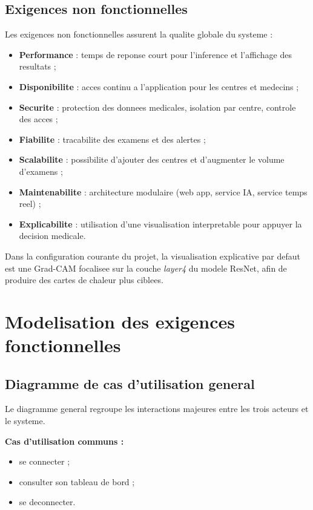 \subsection{Exigences non fonctionnelles}
Les exigences non fonctionnelles assurent la qualite globale du systeme :
\begin{itemize}
    \item \textbf{Performance} : temps de reponse court pour l'inference et l'affichage des resultats ;
    \item \textbf{Disponibilite} : acces continu a l'application pour les centres et medecins ;
    \item \textbf{Securite} : protection des donnees medicales, isolation par centre, controle des acces ;
    \item \textbf{Fiabilite} : tracabilite des examens et des alertes ;
    \item \textbf{Scalabilite} : possibilite d'ajouter des centres et d'augmenter le volume d'examens ;
    \item \textbf{Maintenabilite} : architecture modulaire (web app, service IA, service temps reel) ;
    \item \textbf{Explicabilite} : utilisation d'une visualisation interpretable pour appuyer la decision medicale.
\end{itemize}

Dans la configuration courante du projet, la visualisation explicative par defaut est une Grad-CAM
focalisee sur la couche \textit{layer4} du modele ResNet, afin de produire des cartes de chaleur plus ciblees.

\section{Modelisation des exigences fonctionnelles}

\subsection{Diagramme de cas d'utilisation general}
Le diagramme general regroupe les interactions majeures entre les trois acteurs et le systeme.

\textbf{Cas d'utilisation communs :}
\begin{itemize}
    \item se connecter ;
    \item consulter son tableau de bord ;
    \item se deconnecter.
\end{itemize}


